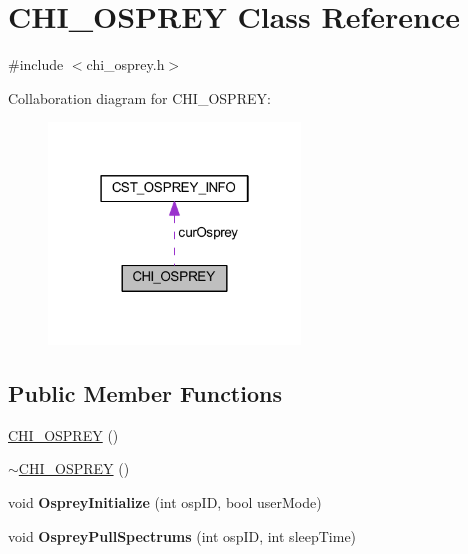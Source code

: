 \hypertarget{class_c_h_i___o_s_p_r_e_y}{}\section{C\+H\+I\+\_\+\+O\+S\+P\+R\+EY Class Reference}
\label{class_c_h_i___o_s_p_r_e_y}


{\ttfamily \#include $<$chi\+\_\+osprey.\+h$>$}



Collaboration diagram for C\+H\+I\+\_\+\+O\+S\+P\+R\+EY\+:\nopagebreak
\begin{figure}[H]
\begin{center}
\leavevmode
\includegraphics[width=190pt]{db/d2b/class_c_h_i___o_s_p_r_e_y__coll__graph}
\end{center}
\end{figure}
\subsection*{Public Member Functions}
\begin{DoxyCompactItemize}
\item 
\hyperlink{class_c_h_i___o_s_p_r_e_y_ab53100273a3288187b5f49ee4d14f1b2_ab53100273a3288187b5f49ee4d14f1b2}{C\+H\+I\+\_\+\+O\+S\+P\+R\+EY} ()
\item 
\hyperlink{class_c_h_i___o_s_p_r_e_y_adfb630759c9dfe8d0d55079cf1e2bf4e_adfb630759c9dfe8d0d55079cf1e2bf4e}{$\sim$\+C\+H\+I\+\_\+\+O\+S\+P\+R\+EY} ()
\item 
\mbox{\label{class_c_h_i___o_s_p_r_e_y_ac8624fc743990f8b4777f424e3d36bc3}} 
void {\bfseries Osprey\+Initialize} (int osp\+ID, bool user\+Mode)
\item 
\mbox{\label{class_c_h_i___o_s_p_r_e_y_adad798cc07dd2c23f939891eceb83a99}} 
void {\bfseries Osprey\+Pull\+Spectrums} (int osp\+ID, int sleep\+Time)
\end{DoxyCompactItemize}
